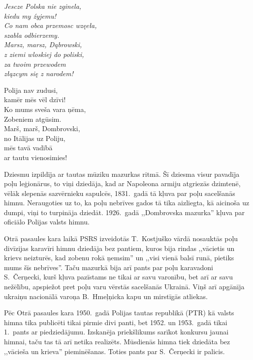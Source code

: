\documentclass[twoside,a5paper,12pt,fleqn,openany]{extbook}
\newcommand{\pltxti}[1]{\textit{\textpolish{#1}}}
\begin{document}
\noindent
\begin{minipage}{0.45\textwidth}
\pltxti{
Jescze Polska nie zginela,\\
kiedu my źyjemu!\\
Co nam obca przemosc wzęeła,\\
szabla odbierzemy.\\
Marsz, marsz, Dąbrowski,\\
z ziemi wloskiej do poliski,\\
za twoim przewodem\\
złązcym się z narodem!}
\end{minipage}
\hspace{2em}
\begin{minipage}{0.45\textwidth}
Polija nav zudusi,\\
kamēr mēs vēl dzīvi!\\
Ko mums sveša vara ņēma,\\
Zobeniem atgūsim.\\
Marš, marš, Dombrovski,\\
no Itālijas uz Poliju,\\
mēs tavā vadībā\\
ar tautu vienosimies!
\end{minipage}

\vspace{1.5em}


Dziesmu izpildīja ar tautas mūziku mazurkas ritmā. Šī dziesma visur pavadīja poļu leģionārus, to viņi dziedāja, kad ar Napoleona armiju atgriezās dzimtenē, vēlāk slepenās sazvērnieku sapulcēs, 1831.~gadā tā kļuva par poļu sacelšanās himnu. Neraugoties uz to, ka poļu nebrīves gados tā tika aizliegta, kā aicinoša uz dumpi, viņi to turpināja dziedāt. 1926.~gadā ,,Dombrovska mazurka'' kļuva par oficiālo Polijas valsts himnu.

Otrā pasaules kara laikā PSRS izveidotās T.~Kostjuško vārdā nosauktās poļu divīzijas karavīri himnu dziedāja bez pantiem, kuros bija rindas ,,vācietis un krievs neizturēs, kad zobenu rokā ņemsim'' un ,,visi vienā balsī runā, pietiks mums šīs nebrīves''. Taču mazurkā bija arī pants par poļu karavadoni S.~Čerņecki, kurš kļuva pazīstams ne tikai ar savu varonību, bet arī ar savu nežēlību, apspiežot pret poļu varu vērstās sacelšanās Ukrainā. Viņš arī apgānīja ukraiņu nacionālā varoņa B.~Hmeļņicka kapu un mirstīgās atliekas.

Pēc Otrā pasaules kara 1950.~gadā Polijas tautas republikā (PTR) kā valsts himna tika publicēti tikai pirmie divi panti, bet 1952. un 1953.~gadā tikai 1.~pants ar piedziedājumu. Izskanēja priekšlikums sarīkot konkursu jaunai himnai, taču tas tā arī netika realizēts. Mūsdienās himna tiek dziedāta bez ,,vācieša un krieva'' pieminēšanas. Toties pants par S.~Čerņecki ir palicis.
\end{document}
